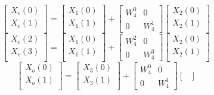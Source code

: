 \documentclass[journal,12pt,twocolumn]{IEEEtran}
\renewcommand\thesection{\arabic{section}}
\begin{document}
\begin{enumerate}[label=\thesection.\arabic*.,ref=\thesection.\theenumi]
\begin{equation}
\begin{bmatrix}
X_{e}(0) \\ 
X_{e}(1)\\ 
\end{bmatrix}
=
\begin{bmatrix}
X_{1}(0) \\ 
X_{1}(1)\\ 
\end{bmatrix}
+
\begin{bmatrix}
W^{0}_{4} & 0\\
0 & W^{1}_{4}
\end{bmatrix}
\begin{bmatrix}
X_{2}(0) \\ 
X_{2}(1) \\ 
\end{bmatrix}
\end{equation}
\begin{equation}
\begin{bmatrix}
X_{e}(2) \\ 
X_{e}(3)\\ 
\end{bmatrix}
=
\begin{bmatrix}
X_{1}(0) \\ 
X_{1}(1)\\ 
\end{bmatrix}
+
\begin{bmatrix}
W^{2}_{4} & 0\\
0 & W^{3}_{4}
\end{bmatrix}
\begin{bmatrix}
X_{2}(0) \\ 
X_{2}(1) \\ 
\end{bmatrix}
\end{equation}
\begin{equation}
\begin{bmatrix}
X_{o}(0) \\ 
X_{o}(1)\\ 
\end{bmatrix}
=
\begin{bmatrix}
X_{3}(0) \\ 
X_{3}(1)\\ 
\end{bmatrix}
+
\begin{bmatrix}
W^{0}_{4} & 0\\
0 & W^{1}_{4}
\end{bmatrix}
\begin{bmatrix}

\end{bmatrix}
\end{equation}
\end{enumerate}
\end{document}
